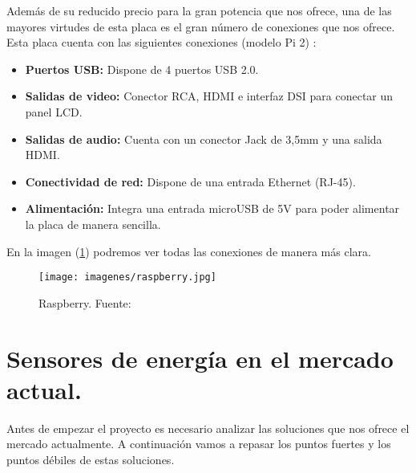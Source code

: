 Además de su reducido precio para la gran potencia que nos ofrece, una de las mayores virtudes de esta placa es el gran número de conexiones que nos ofrece. Esta placa cuenta con las siguientes conexiones (modelo Pi 2) : \cite{raspberrywikipedia}

\begin{itemize}
	\item\textbf{Puertos USB: } Dispone de 4 puertos USB 2.0.
	\item\textbf{Salidas de video: } Conector RCA, HDMI e interfaz DSI para conectar un panel LCD.
	\item\textbf{Salidas de audio: } Cuenta con un conector Jack de 3,5mm y una salida HDMI.
	\item\textbf{Conectividad de red: } Dispone de una entrada Ethernet (RJ-45).
	\item\textbf{Alimentación: } Integra una entrada microUSB de 5V para poder alimentar la placa de manera sencilla.
\end{itemize}

En la imagen (\ref{fig:Raspberryimg}) podremos ver todas las conexiones de manera más clara.

\begin{figure}[H]
	\centering
	\texttt{[image: imagenes/raspberry.jpg]}
	\caption[Raspberry.]{Raspberry. Fuente: \cite{imagenraspberry}}
	\label{fig:Raspberryimg}
\end{figure}



\section{Sensores de energía en el mercado actual.}
Antes de empezar el proyecto es necesario analizar las soluciones que nos ofrece el mercado actualmente. A continuación vamos a repasar los puntos fuertes y los puntos débiles de estas soluciones.

